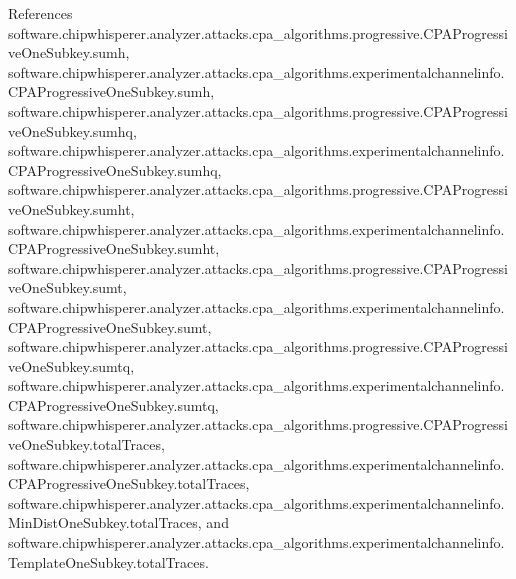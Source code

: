 References software.\+chipwhisperer.\+analyzer.\+attacks.\+cpa\+\_\+algorithms.\+progressive.\+C\+P\+A\+Progressive\+One\+Subkey.\+sumh, software.\+chipwhisperer.\+analyzer.\+attacks.\+cpa\+\_\+algorithms.\+experimentalchannelinfo.\+C\+P\+A\+Progressive\+One\+Subkey.\+sumh, software.\+chipwhisperer.\+analyzer.\+attacks.\+cpa\+\_\+algorithms.\+progressive.\+C\+P\+A\+Progressive\+One\+Subkey.\+sumhq, software.\+chipwhisperer.\+analyzer.\+attacks.\+cpa\+\_\+algorithms.\+experimentalchannelinfo.\+C\+P\+A\+Progressive\+One\+Subkey.\+sumhq, software.\+chipwhisperer.\+analyzer.\+attacks.\+cpa\+\_\+algorithms.\+progressive.\+C\+P\+A\+Progressive\+One\+Subkey.\+sumht, software.\+chipwhisperer.\+analyzer.\+attacks.\+cpa\+\_\+algorithms.\+experimentalchannelinfo.\+C\+P\+A\+Progressive\+One\+Subkey.\+sumht, software.\+chipwhisperer.\+analyzer.\+attacks.\+cpa\+\_\+algorithms.\+progressive.\+C\+P\+A\+Progressive\+One\+Subkey.\+sumt, software.\+chipwhisperer.\+analyzer.\+attacks.\+cpa\+\_\+algorithms.\+experimentalchannelinfo.\+C\+P\+A\+Progressive\+One\+Subkey.\+sumt, software.\+chipwhisperer.\+analyzer.\+attacks.\+cpa\+\_\+algorithms.\+progressive.\+C\+P\+A\+Progressive\+One\+Subkey.\+sumtq, software.\+chipwhisperer.\+analyzer.\+attacks.\+cpa\+\_\+algorithms.\+experimentalchannelinfo.\+C\+P\+A\+Progressive\+One\+Subkey.\+sumtq, software.\+chipwhisperer.\+analyzer.\+attacks.\+cpa\+\_\+algorithms.\+progressive.\+C\+P\+A\+Progressive\+One\+Subkey.\+total\+Traces, software.\+chipwhisperer.\+analyzer.\+attacks.\+cpa\+\_\+algorithms.\+experimentalchannelinfo.\+C\+P\+A\+Progressive\+One\+Subkey.\+total\+Traces, software.\+chipwhisperer.\+analyzer.\+attacks.\+cpa\+\_\+algorithms.\+experimentalchannelinfo.\+Min\+Dist\+One\+Subkey.\+total\+Traces, and software.\+chipwhisperer.\+analyzer.\+attacks.\+cpa\+\_\+algorithms.\+experimentalchannelinfo.\+Template\+One\+Subkey.\+total\+Traces.


